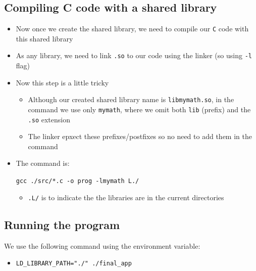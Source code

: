 \documentclass[12pt,a4paper]{book}
\begin{document}
\subsection{Compiling C code with a shared library}
\label{libraries_C:compiling_code_shared_lib}

\begin{itemize}

\item Now once we create the shared library, we need to compile our \verb|C| code with this shared library

\item As any library, we need to link \verb|.so|  to our code using the linker (so using \verb|-l| flag)

\item Now this step is a little tricky

	\begin{itemize}

	\item Although our created shared library name is \verb|libmymath.so|, in the command we use only \verb|mymath|, where we omit both \verb|lib| (prefix) and the \verb|.so| extension
	
	\item The linker epxect these prefixes/postfixes so no need to add them in the command

	\end{itemize}


\item The command is:

\verb|gcc ./src/*.c -o prog -lmymath L./|

	\begin{itemize}
	\item \verb|.L/| is to indicate the the libraries are in the current directories
	\end{itemize}


\end{itemize}

\subsection{Running the program}

We use the following command using the environment variable:

\begin{itemize}

\item \verb|LD_LIBRARY_PATH="./" ./final_app|

\end{itemize}






\end{document}

